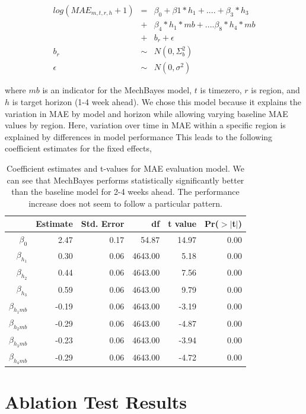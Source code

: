 \documentclass[11pt]{amsart}
\begin{document}
\begin{eqnarray*}
log(MAE_{m,t,r,h} +1) &=& \beta_0 +  \beta1*h_1 + ....+ \beta_3*h_3 \\
&+& \beta_4 *h_1*mb + .... \beta_8*h_4*mb\\
 &+& b_{r} + \epsilon \\
b_{r} &\sim &N(0,\Sigma_b^2)\\
\epsilon &\sim& N(0,\sigma^2)
\end{eqnarray*}

where $mb$ is an indicator for the MechBayes model, $t$ is timezero, $r$ is region, and $h$ is target horizon (1-4 week ahead). We chose this model because it explains the variation in MAE by model and horizon while allowing varying baseline MAE values by region. Here, variation over time in MAE within a specific region is explained by differences in model performance This leads to the following coefficient estimates for the fixed effects,

\begin{table}[ht]
\centering
\begin{tabular}{rrrrrr}
  \hline
 & Estimate & Std. Error & df & t value & Pr($>$$|$t$|$) \\ 
  \hline
$\beta_0$  & 2.47 & 0.17 & 54.87 & 14.97 & 0.00 \\ 
   $\beta_{h_1}$ & 0.30 & 0.06 & 4643.00 & 5.18 & 0.00 \\ 
 $\beta_{h_2} $ & 0.44 & 0.06 & 4643.00 & 7.56 & 0.00 \\ 
  $\beta_{h_3}$ & 0.59 & 0.06 & 4643.00 & 9.79 & 0.00 \\ 
  $\beta_{h_1 mb}$  & -0.19 & 0.06 & 4643.00 & -3.19 & 0.00 \\ 
  $\beta_{h_2 mb}$ & -0.29 & 0.06 & 4643.00 & -4.87 & 0.00 \\ 
   $\beta_{h_3mb}$ & -0.23 & 0.06 & 4643.00 & -3.94 & 0.00 \\ 
 $\beta_{h_4mb}$ & -0.29 & 0.06 & 4643.00 & -4.72 & 0.00 \\ 
   \hline
\end{tabular}
\caption{Coefficient estimates and t-values for MAE evaluation model. We can see that MechBayes performs statistically significantly better than the baseline model for 2-4 weeks ahead. The performance increase does not seem to follow a particular pattern.}
\end{table}


   \section{Ablation Test Results}
\end{document}
